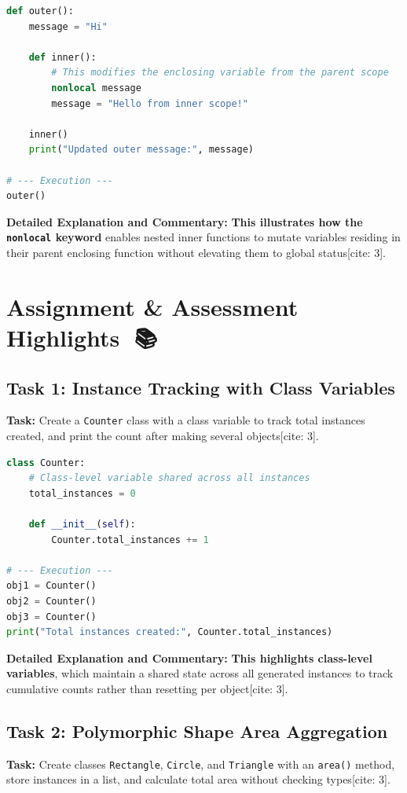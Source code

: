 \documentclass[12pt,a4paper]{article}
\begin{document}
\begin{lstlisting}[language=Python]
def outer():
    message = "Hi"
    
    def inner():
        # This modifies the enclosing variable from the parent scope
        nonlocal message
        message = "Hello from inner scope!"
        
    inner()
    print("Updated outer message:", message)

# --- Execution ---
outer()
\end{lstlisting}

\noindent\textbf{Detailed Explanation and Commentary:}
\textbf{This illustrates how the \texttt{nonlocal} keyword} enables nested inner functions to mutate variables residing in their parent enclosing function without elevating them to global status[cite: 3].

\section*{Assignment \& Assessment Highlights 🚀📚}

\subsection*{Task 1: Instance Tracking with Class Variables}
\textbf{Task:} Create a \texttt{Counter} class with a class variable to track total instances created, and print the count after making several objects[cite: 3].

\begin{lstlisting}[language=Python]
class Counter:
    # Class-level variable shared across all instances
    total_instances = 0
    
    def __init__(self):
        Counter.total_instances += 1

# --- Execution ---
obj1 = Counter()
obj2 = Counter()
obj3 = Counter()
print("Total instances created:", Counter.total_instances)
\end{lstlisting}

\noindent\textbf{Detailed Explanation and Commentary:}
\textbf{This highlights class-level variables}, which maintain a shared state across all generated instances to track cumulative counts rather than resetting per object[cite: 3].

\subsection*{Task 2: Polymorphic Shape Area Aggregation}
\textbf{Task:} Create classes \texttt{Rectangle}, \texttt{Circle}, and \texttt{Triangle} with an \texttt{area()} method, store instances in a list, and calculate total area without checking types[cite: 3].
\end{document}
